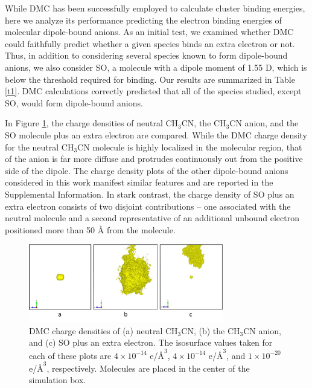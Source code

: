 While DMC has been successfully employed to calculate cluster binding energies,\cite{10.1021/jp9066108,10.1021/jp404541c} here we analyze its performance predicting the electron binding energies of molecular dipole-bound anions. As an initial test, we examined whether DMC could faithfully predict whether a given species binds an extra electron or not. Thus, in addition to considering several species known to form dipole-bound anions, we also consider SO, a molecule with a dipole moment of 1.55 D, which is below the threshold required for binding. Our results are summarized in Table \ref{t1}. DMC calculations correctly predicted that all of the species studied, except SO, would form dipole-bound anions. 

In Figure \ref{f1}, the charge densities of neutral CH$_{3}$CN, the CH$_{3}$CN anion, and the SO molecule plus an extra electron are compared. While the DMC charge density for the neutral CH$_{3}$CN molecule is highly localized in the molecular region, that of the anion is far more diffuse and protrudes continuously out from the positive side of the dipole. The charge density plots of the other dipole-bound anions considered in this work manifest similar features and are reported in the Supplemental Information. In stark contrast, the charge density of SO plus an extra electron consists of two disjoint contributions -- one associated with the neutral molecule and a second representative of an additional unbound electron positioned more than 50 $\mbox{\AA}$ from the molecule. 
\begin{center}
\begin{figure}[htbp]
\includegraphics[width=8.5cm]{Images/chapter2/Neutral-anion-SO.pdf}
\caption{DMC charge densities of (a) neutral CH$_3$CN, (b) the CH$_3$CN anion, and (c) SO plus an extra electron. The isosurface values taken for each of these plots are $4 \times 10^{-14}$ e/$\mbox{\AA}^3$, $4\times 10^{-14}$ e/$\mbox{\AA}^3$, and $1 \times 10^{-20}$ e/$\mbox{\AA}^3$, respectively. Molecules are placed in the center of the simulation box.}
\label{f1}
\end{figure}
\end{center}

